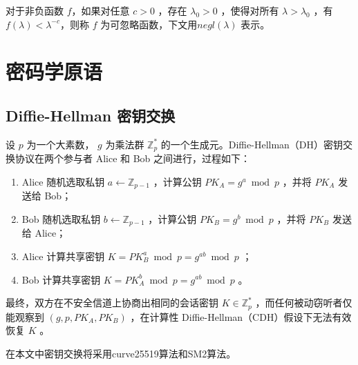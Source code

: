 \begin{definition}[可忽略函数]
对于非负函数 $f$，如果对任意  $ c > 0 $ ，存在  $ \lambda_0 >0 $ ，使得对所有  $ \lambda > \lambda_0 $ ，有
 $ f(\lambda) < \lambda^{-c}$，则称 $f$ 为可忽略函数，下文用$negl(\lambda)$ 表示。

 

\end{definition}

\section{密码学原语}

\subsection{Diffie-Hellman 密钥交换}

设  $ p $  为一个大素数， $ g $  为乘法群  $ \mathbb{Z}_p^* $  的一个生成元。Diffie-Hellman（DH）密钥交换协议在两个参与者 Alice 和 Bob 之间进行，过程如下：
\begin{enumerate}
    \item Alice 随机选取私钥  $ a \leftarrow \mathbb{Z}_{p-1} $ ，计算公钥  $ PK_A = g^a \bmod p $ ，并将  $ PK_A $  发送给 Bob；
    \item Bob 随机选取私钥  $ b \leftarrow \mathbb{Z}_{p-1} $ ，计算公钥  $ PK_B = g^b \bmod p $ ，并将  $ PK_B $  发送给 Alice；
    \item Alice 计算共享密钥  $ K = PK_B^a \bmod p = g^{ab} \bmod p $ ；
    \item Bob 计算共享密钥  $ K = PK_A^b \bmod p = g^{ab} \bmod p $ 。
\end{enumerate}

最终，双方在不安全信道上协商出相同的会话密钥  $ K \in \mathbb{Z}_p^* $ ，而任何被动窃听者仅能观察到  $ (g, p, PK_A, PK_B) $ ，在计算性 Diffie-Hellman（CDH）假设下无法有效恢复  $ K $ 。

在本文中密钥交换将采用curve25519算法和SM2算法。

